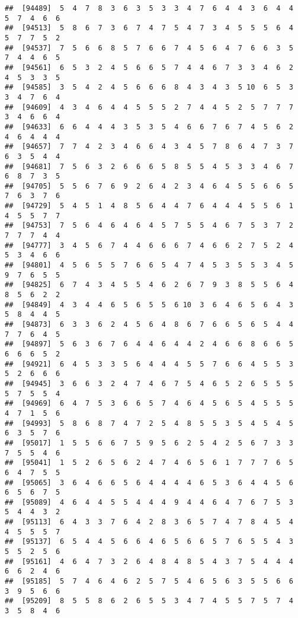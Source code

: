 \documentclass[
]{book}
\begin{document}
\begin{verbatim}
##  [94489]  5  4  7  8  3  6  3  5  3  3  4  7  6  4  4  3  6  4  4  5  7  4  6  6
##  [94513]  5  8  6  7  3  6  7  4  7  5  4  7  3  4  5  5  5  6  4  5  7  7  5  2
##  [94537]  7  5  6  6  8  5  7  6  6  7  4  5  6  4  7  6  6  3  5  7  4  4  6  5
##  [94561]  6  5  3  2  4  5  6  6  5  7  4  4  6  7  3  3  4  6  2  4  5  3  3  5
##  [94585]  3  5  4  2  4  5  6  6  6  8  4  3  4  3  5 10  6  5  3  3  4  7  6  4
##  [94609]  4  3  4  6  4  4  5  5  5  2  7  4  4  5  2  5  7  7  7  3  4  6  6  4
##  [94633]  6  6  4  4  4  3  5  3  5  4  6  6  7  6  7  4  5  6  2  4  6  4  4  4
##  [94657]  7  7  4  2  3  4  6  6  4  3  4  5  7  8  6  4  7  3  7  6  3  5  4  4
##  [94681]  7  5  6  3  2  6  6  6  5  8  5  5  4  5  3  3  4  6  7  6  8  7  3  5
##  [94705]  5  5  6  7  6  9  2  6  4  2  3  4  6  4  5  5  6  6  5  7  6  3  7  6
##  [94729]  5  4  5  1  4  8  5  6  4  4  7  6  4  4  4  5  5  6  1  4  5  5  7  7
##  [94753]  7  5  6  4  6  4  6  4  5  7  5  5  4  6  7  5  3  7  2  7  7  7  4  4
##  [94777]  3  4  5  6  7  4  4  6  6  6  7  4  6  6  2  7  5  2  4  5  3  4  6  6
##  [94801]  4  5  6  5  5  7  6  6  5  4  7  4  5  3  5  5  3  4  5  9  7  6  5  5
##  [94825]  6  7  4  3  4  5  5  4  6  2  6  7  9  3  8  5  5  6  4  8  5  6  2  2
##  [94849]  4  3  4  4  6  5  6  5  5  6 10  3  6  4  6  5  6  4  3  5  8  4  4  5
##  [94873]  6  3  3  6  2  4  5  6  4  8  6  7  6  6  5  6  5  4  4  7  7  6  4  5
##  [94897]  5  6  3  6  7  6  4  4  6  4  4  2  4  6  6  8  6  6  5  6  6  6  5  2
##  [94921]  6  4  5  3  3  5  6  4  4  4  5  5  7  6  6  4  5  5  3  5  2  6  6  6
##  [94945]  3  6  6  3  2  4  7  4  6  7  5  4  6  5  2  6  5  5  5  5  7  5  5  4
##  [94969]  6  4  7  5  3  6  6  5  7  4  6  4  5  6  5  4  5  5  5  4  7  1  5  6
##  [94993]  5  8  6  8  7  4  7  2  5  4  8  5  5  3  5  4  5  4  5  6  3  5  7  6
##  [95017]  1  5  5  6  6  7  5  9  5  6  2  5  4  2  5  6  7  3  3  7  5  5  4  6
##  [95041]  1  5  2  6  5  6  2  4  7  4  6  5  6  1  7  7  7  6  5  6  4  7  5  5
##  [95065]  3  6  4  6  6  5  6  4  4  4  4  6  5  3  6  4  4  5  6  6  5  6  7  5
##  [95089]  4  6  4  4  5  5  4  4  4  9  4  4  6  4  7  6  7  5  3  5  4  4  3  2
##  [95113]  6  4  3  3  7  6  4  2  8  3  6  5  7  4  7  8  4  5  4  4  5  5  5  7
##  [95137]  6  5  4  4  5  6  6  4  6  5  6  6  5  7  6  5  5  4  3  5  5  2  5  6
##  [95161]  4  6  4  7  3  2  6  4  8  4  8  5  4  3  7  5  4  4  4  6  6  2  4  6
##  [95185]  5  7  4  6  4  6  2  5  7  5  4  6  5  6  3  5  5  6  6  3  9  5  6  6
##  [95209]  8  5  5  8  6  2  6  5  5  3  4  7  4  5  5  7  5  7  4  3  5  8  4  6

\end{verbatim}
\end{document}
